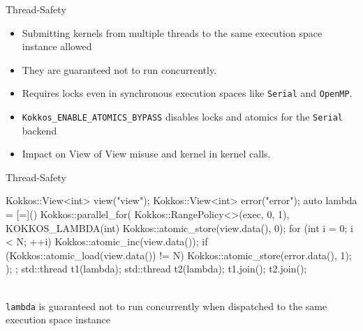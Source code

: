 \begin{frame}[fragile]{Thread-Safety}
  \begin{itemize}
    \item Submitting kernels from multiple threads to the same execution space instance allowed
    \item They are guaranteed not to run concurrently. 
    \item Requires locks even in synchronous execution spaces like \texttt{Serial} and \texttt{OpenMP}.
    \item \texttt{Kokkos\_ENABLE\_ATOMICS\_BYPASS} disables locks and atomics for the \texttt{Serial} backend
    \item Impact on View of View misuse and kernel in kernel calls.
  \end{itemize}
\end{frame}

\begin{frame}[fragile]{Thread-Safety}
\begin{code}
  Kokkos::View<int> view("view");
  Kokkos::View<int> error("error");
  auto lambda = [=]() {
    Kokkos::parallel_for(
      Kokkos::RangePolicy<>(exec, 0, 1), KOKKOS_LAMBDA(int) {
          Kokkos::atomic_store(view.data(), 0);
          for (int i = 0; i < N; ++i) Kokkos::atomic_inc(view.data());
          if (Kokkos::atomic_load(view.data()) != N)
            Kokkos::atomic_store(error.data(), 1);
        });
  };
  std::thread t1(lambda);
  std::thread t2(lambda);
  t1.join();
  t2.join();
\end{code}\\
\texttt{lambda} is guaranteed not to run concurrently when dispatched to the same execution space instance
\end{frame}

